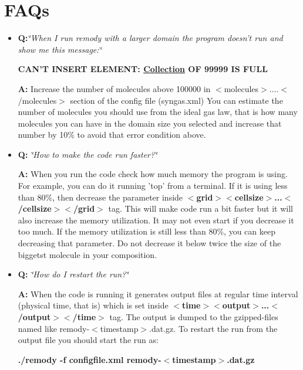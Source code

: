 \hypertarget{FAQ_SecFAQ}{}\section{FAQs}\label{FAQ_SecFAQ}
\begin{itemize}
\item {\bf Q:}{\em \char`\"{}When I run remody with a larger domain the program doesn't run and show me this message:\char`\"{}\/} \par
\par
{\bf CAN'T INSERT ELEMENT: \hyperlink{classCollection}{Collection} OF 99999 IS FULL}\par
\par
 {\bf A:} Increase the number of molecules above 100000 in $<$molecules$>$....$<$/molecules$>$ section of the config file (syngas.xml) You can estimate the number of molecules you should use from the ideal gas law, that is how many molecules you can have in the domain size you selected and increase that number by 10\% to avoid that error condition above.\end{itemize}


\begin{itemize}
\item {\bf Q:} {\em \char`\"{}How to make the code run faster?\char`\"{}\/}\par
 {\bf A:} When you run the code check how much memory the program is using. For example, you can do it running 'top' from a terminal. If it is using less than 80\%, then decrease the parameter inside {\bf $<$grid$>$$<$cellsize$>$...$<$/cellsize$>$$<$/grid$>$} tag. This will make code run a bit faster but it will also increase the memory utilization. It may not even start if you decrease it too much. If the memory utilization is still less than 80\%, you can keep decreasing that parameter. Do not decrease it below twice the size of the biggetst molecule in your composition.\end{itemize}


\begin{itemize}
\item {\bf Q:} {\em \char`\"{}How do I restart the run?\char`\"{}\/}\par
 {\bf A:} When the code is running it generates output files at regular time interval (physical time, that is) which is set inside {\bf $<$time$>$$<$output$>$...$<$/output$>$$<$/time$>$} tag. The output is dumped to the gzipped-files named like remody-$<$timestamp$>$.dat.gz. To restart the run from the output file you should start the run as: \par
\par
{\bf ./remody -f configfile.xml remody-$<$timestamp$>$.dat.gz}\par
\par
\end{itemize}


